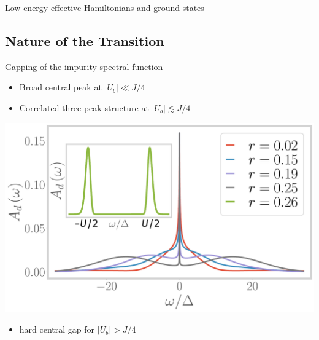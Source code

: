 \documentclass[8pt,aspectratio=169]{beamer}
\newcommand{\nitem}{\item[\ding{51}]}
\begin{document}
\begin{frame}{Low-energy effective Hamiltonians and ground-states}
\end{frame}

\begin{frame}{}
\section{Nature of the Transition}
\end{frame}

\begin{frame}{Gapping of the impurity spectral function}
\begin{minipage}{0.25\textwidth}
\begin{itemize}
\nitem Broad central peak at \(|U_b| \ll J/4\)
\end{itemize}
\end{minipage}
\hspace{\fill}
\begin{minipage}{0.45\textwidth}
\begin{itemize}
\nitem Correlated \alert{three peak} structure at \(|U_b| \lesssim J/4\)\\[10pt]
\end{itemize}
\includegraphics[width=\textwidth]{Add.pdf}
\end{minipage}
\hspace{\fill}
\begin{minipage}{0.25\textwidth}
\begin{itemize}
\nitem hard central \alert{gap} for  \(|U_b| > J/4\)
\end{itemize}
\end{minipage}

\end{frame}
\end{document}
